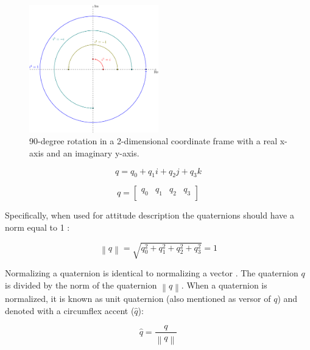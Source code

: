 \begin{figure}[!h]
    \centering
    \includegraphics[width=0.5\textwidth]{figures/complex_rotation.pdf}
    \caption{90-degree rotation in a 2-dimensional coordinate frame with a real x-axis and an imaginary y-axis. }
    \label{fig:complex_rotation}
\end{figure}

\begin{equation}
    q = q_0 + q_1 i + q_2 j + q_3 k
    \label{eq:quaternion_representation}
\end{equation}

\begin{equation}
    q =     \begin{bmatrix}
        q_0 & q_1 & q_2 & q_3 \\
    \end{bmatrix}
    \label{eq:quaternion_vector}
\end{equation}

Specifically, when used for attitude description the quaternions should have a norm equal to 1 \cite{valenti2015keeping}:

\begin{equation}
    \left\lVert q\right\rVert =\sqrt{q^2_0 + q^2_1 + q^2_2 + q^2_3} =1
\end{equation}

Normalizing a quaternion is identical to normalizing a vector \cite{bar1985attitude}. The quaternion $q$ is divided by the norm of the quaternion $\left\lVert q \right\rVert$. When a quaternion is normalized, it is known as unit quaternion (also mentioned as versor of $q$) and denoted with a circumflex accent ($\hat{q}$):

\begin{equation}
    \hat{q} = \frac{q}{\left\lVert q \right\rVert }
\end{equation}



